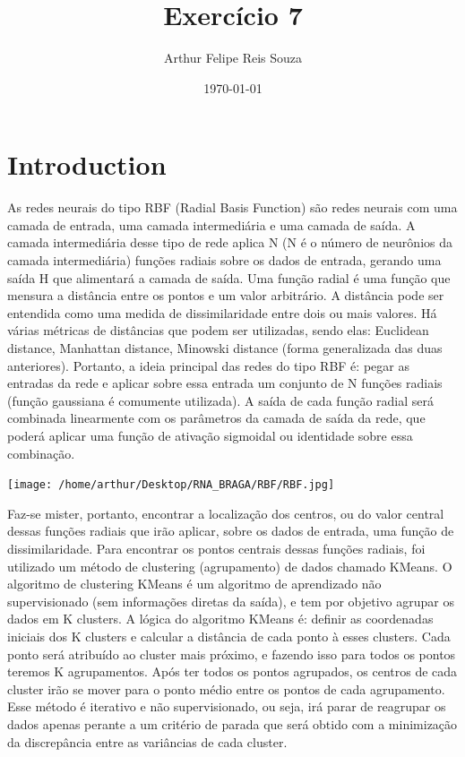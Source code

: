 \documentclass{article}
\begin{document}
\title{Exercício 7} 
\author{Arthur Felipe Reis Souza}
\date{\today}
\maketitle

\section{Introduction}

As redes neurais do tipo RBF (Radial Basis Function) são redes neurais com uma camada de entrada, uma camada intermediária e uma camada de saída. A camada intermediária desse tipo de rede aplica N (N é o número de neurônios da camada intermediária) funções radiais sobre os dados de entrada, gerando uma saída H que alimentará a camada de saída. Uma função radial é uma função que mensura a distância entre os pontos e um valor arbitrário. A distância pode ser entendida como uma medida de dissimilaridade entre dois ou mais valores. Há várias métricas de distâncias que podem ser utilizadas, sendo elas: Euclidean distance, Manhattan distance, Minowski distance (forma generalizada das duas anteriores). Portanto, a ideia principal das redes do tipo RBF é: pegar as entradas da rede e aplicar sobre essa entrada um conjunto de N funções radiais (função gaussiana é comumente utilizada). A saída de cada função radial será combinada linearmente com os parâmetros da camada de saída da rede, que poderá aplicar uma função de ativação sigmoidal ou identidade sobre essa combinação.

\vspace{20pt}

\begin{center}

\texttt{[image: /home/arthur/Desktop/RNA\_BRAGA/RBF/RBF.jpg]}

\end{center}

Faz-se mister, portanto, encontrar a localização dos centros, ou do valor central dessas funções radiais que irão aplicar, sobre os dados de entrada, uma função de dissimilaridade. Para encontrar os pontos centrais dessas funções radiais, foi utilizado um método de clustering (agrupamento) de dados chamado KMeans. O algoritmo de clustering KMeans é um algoritmo de aprendizado não supervisionado (sem informações diretas da saída), e tem por objetivo agrupar os dados em K clusters. A lógica do algoritmo KMeans é: definir as coordenadas iniciais dos K clusters e calcular a distância de cada ponto à esses clusters. Cada ponto será atribuído ao cluster mais próximo, e fazendo isso para todos os pontos teremos K agrupamentos. Após ter todos os pontos agrupados, os centros de cada cluster irão se mover para o ponto médio entre os pontos de cada agrupamento. Esse método é iterativo e não supervisionado, ou seja, irá parar de reagrupar os dados apenas perante a um critério de parada que será obtido com a minimização da discrepância entre as variâncias de cada cluster.
\end{document}
